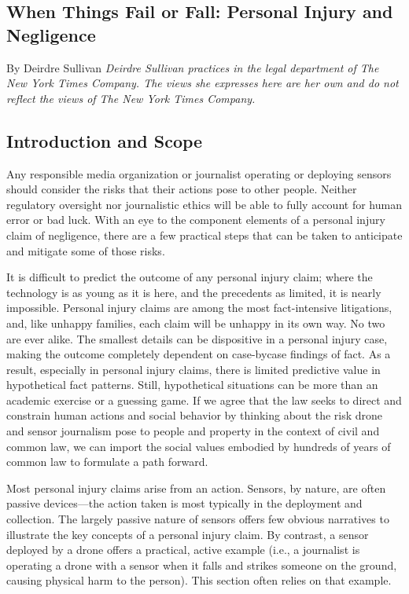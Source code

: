 \begin{itemize}
\begin{itemized}
\chapter{When Things Fail or Fall: Personal Injury and Negligence}
By Deirdre Sullivan
\textit{Deirdre Sullivan practices in the legal department of The New York Times Company. The views she
expresses here are her own and do not reflect the views of The New York Times Company.}

\section{Introduction and Scope}
Any responsible media organization or journalist operating or deploying
sensors should consider the risks that their actions pose to other people.
Neither regulatory oversight nor journalistic ethics will be able to fully
account for human error or bad luck. With an eye to the component elements
of a personal injury claim of negligence, there are a few practical
steps that can be taken to anticipate and mitigate some of those risks.

It is difficult to predict the outcome of any personal injury claim; where
the technology is as young as it is here, and the precedents as limited, it is
nearly impossible. Personal injury claims are among the most fact-intensive
litigations, and, like unhappy families, each claim will be unhappy in its own
way. No two are ever alike. The smallest details can be dispositive in a personal
injury case, making the outcome completely dependent on case-bycase
findings of fact. As a result, especially in personal injury claims, there
is limited predictive value in hypothetical fact patterns. Still, hypothetical
situations can be more than an academic exercise or a guessing game. If we
agree that the law seeks to direct and constrain human actions and social
behavior by thinking about the risk drone and sensor journalism pose to people and property in the context of civil and common law, we can import
the social values embodied by hundreds of years of common law to formulate
a path forward.


Most personal injury claims arise from an action. Sensors, by nature, are
often passive devices—the action taken is most typically in the deployment
and collection. The largely passive nature of sensors offers few obvious narratives
to illustrate the key concepts of a personal injury claim. By contrast,
a sensor deployed by a drone offers a practical, active example (i.e., a journalist
is operating a drone with a sensor when it falls and strikes someone
on the ground, causing physical harm to the person). This section often
relies on that example.


\end{itemized}
\end{itemize}
